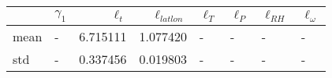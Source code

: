 \begin{tabular}{llrrllll}
\toprule
{} & $\gamma_1$ &  $\ell_t$ &  $\ell_{latlon}$ & $\ell_T$ & $\ell_P$ & $\ell_{RH}$ & $\ell_\omega$ \\
\midrule
mean &          - &  6.715111 &         1.077420 &        - &        - &           - &             - \\
std  &          - &  0.337456 &         0.019803 &        - &        - &           - &             - \\
\bottomrule
\end{tabular}

